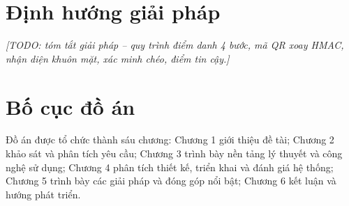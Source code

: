 \documentclass[../main.tex]{subfiles}
\begin{document}
\section{Định hướng giải pháp}
\textit{[TODO: tóm tắt giải pháp -- quy trình điểm danh 4 bước, mã QR xoay HMAC, nhận diện khuôn mặt, xác minh chéo, điểm tin cậy.]}

\section{Bố cục đồ án}
Đồ án được tổ chức thành sáu chương: Chương 1 giới thiệu đề tài; Chương 2 khảo sát và phân tích yêu cầu; Chương 3 trình bày nền tảng lý thuyết và công nghệ sử dụng; Chương 4 phân tích thiết kế, triển khai và đánh giá hệ thống; Chương 5 trình bày các giải pháp và đóng góp nổi bật; Chương 6 kết luận và hướng phát triển.
\end{document}
